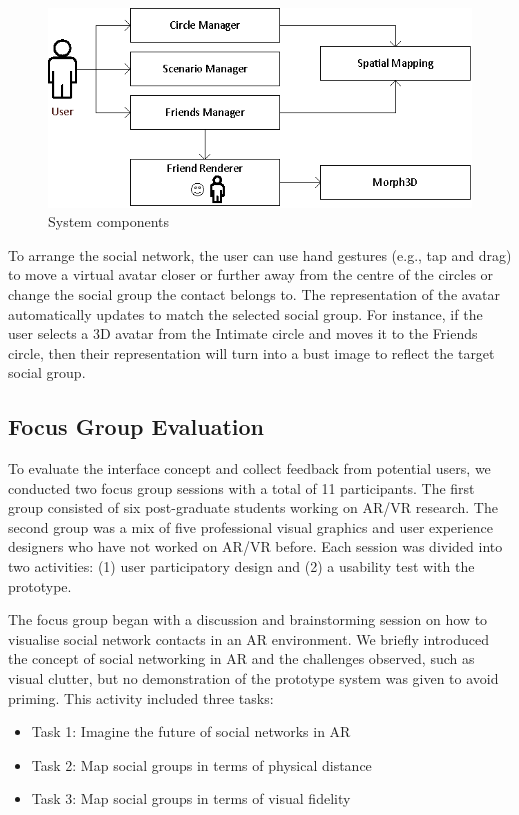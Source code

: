 \begin{figure}[ht]
  \centering
  \includegraphics[width=0.8\linewidth]{images/mgia17/system-diagram.eps}
  \caption{System components}
    \label{fig:contacts:system-diagram}
\end{figure}

To arrange the social network, the user can use hand gestures (e.g., tap and drag) to move a virtual avatar closer or further away from the centre of the circles or change the social group the contact belongs to. The representation of the avatar automatically updates to match the selected social group. For instance, if the user selects a 3D avatar from the Intimate circle and moves it to the Friends circle, then their representation will turn into a bust image to reflect the target social group.

\subsection{Focus Group Evaluation}

To evaluate the interface concept and collect feedback from potential users, we conducted two focus group sessions with a total of 11 participants. The first group consisted of six post-graduate students working on AR/VR research. The second group was a mix of five professional visual graphics and user experience designers who have not worked on AR/VR before. Each session was divided into two activities: (1) user participatory design and (2) a usability test with the prototype. 

The focus group began with a discussion and brainstorming session on how to visualise social network contacts in an AR environment. We briefly introduced the concept of social networking in AR and the challenges observed, such as visual clutter, but no demonstration of the prototype system was given to avoid priming. This activity included three tasks: 

\begin{itemize}
    \item Task 1: Imagine the future of social networks in AR 
    \item Task 2: Map social groups in terms of physical distance 
    \item Task 3: Map social groups in terms of visual fidelity 
\end{itemize}

